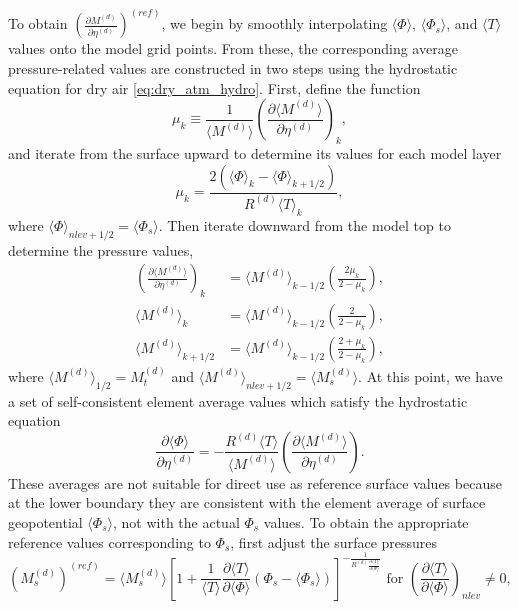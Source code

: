 \documentclass{agujournal}
\begin{document}
{To obtain $\left( \frac{\partial M^{(d)}}{\partial \eta^{(d)}}\right)^{(ref)}$, we begin by smoothly interpolating $\langle \Phi \rangle$, $\langle \Phi_s \rangle$, and $\langle T \rangle$ values onto the model grid points. From these, the corresponding average pressure-related values are constructed in two steps using the hydrostatic equation for dry air \eqref{eq:dry_atm_hydro}. First, define the function
\begin{equation}
\mu_k \equiv \frac{1}{\langle M^{(d)} \rangle} \left( \frac{\partial \langle M^{(d)}\rangle}{\partial \eta^{(d)}}\right)_k,
\end{equation}
and iterate from the surface upward to determine its values for each model layer
\begin{equation}
\mu_k=\frac{2\left( \langle \Phi \rangle_k-\langle \Phi \rangle_{k+1/2} \right)}{R^{(d)}\langle T \rangle_k},
\end{equation}
where $\langle \Phi \rangle_{nlev+1/2}=\langle \Phi_s \rangle$. Then iterate downward from the model top to determine the pressure values,
\begin{align}
\left( \frac{\partial \langle M^{(d)}\rangle}{\partial \eta^{(d)}}\right)_k &= \langle M^{(d)} \rangle_{k-1/2}\left( \frac{2\mu_k}{2-\mu_k}\right),\\
\langle M^{(d)} \rangle_{k}&=\langle M^{(d)} \rangle_{k-1/2}\left( \frac{2}{2-\mu_k}\right),\\
\langle M^{(d)} \rangle_{k+1/2}&=\langle M^{(d)} \rangle_{k-1/2}\left( \frac{2+\mu_k}{2-\mu_k}\right),
\end{align}
where $\langle M^{(d)} \rangle_{1/2}=M^{(d)}_t$ and  $\langle M^{(d)} \rangle_{nlev+1/2}=\langle M^{(d)}_s \rangle$. At this point, we have a set of self-consistent element average values which satisfy the hydrostatic equation
\begin{equation}
\frac{\partial \langle \Phi \rangle}{\partial \eta^{(d)}}=-\frac{R^{(d)}\langle T\rangle}{\langle M^{(d)}\rangle}\left( \frac{\partial \langle M^{(d)}\rangle}{\partial \eta^{(d)}}\right).
\end{equation}
These averages are not suitable for direct use as reference surface values because at the lower boundary they are consistent with the element average of surface geopotential $\langle \Phi_s \rangle$, not with the actual $\Phi_s$ values. To obtain the appropriate reference values corresponding to $\Phi_s$, first adjust the surface pressures
\begin{equation}
\left( M^{(d)}_s \right)^{(ref)}=\langle M^{(d)}_s \rangle\left[ 1+\frac{1}{\langle T\rangle}\frac{\partial \langle T\rangle}{\partial \langle \Phi \rangle}\left( \Phi_s-\langle \Phi_s\rangle \right)\right]^{-\frac{1}{R^{(d)}\frac{\partial \langle T\rangle}{\partial \langle \Phi \rangle}}}\text{ for }\left( \frac{\partial \langle T\rangle}{\partial \langle \Phi \rangle}\right)_{nlev}\neq 0,

\end{equation}}
\end{document}

